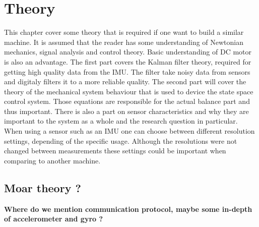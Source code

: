 \documentclass[a4paper,11pt]{kth-mag}
\begin{document}
\chapter{Theory}
This chapter cover some theory that is required if one want to build a similar machine. It is assumed that the reader has some 
understanding of Newtonian mechanics, signal analysis and control theory. Basic understanding of DC motor is also an advantage.  
The first part covers the Kalman filter theory, required for getting high quality data from the IMU. The filter take noisy data from sensors and digitaly filters it to a more reliable quality. The second part will cover 
the theory of the mechanical system behaviour that is used to device the state space control system. Those equations are responsible for the actual balance part and thus important. There is also a part on sensor characteristics and why they are important 
to the system as a whole and the research question in particular. When using a sensor such as an IMU one can choose between different resolution settings, depending of the specific usage. Although the resolutions were not changed between measurements these settings could be important when comparing to another machine.

\section{Moar theory ?}
\textbf{Where do we mention communication protocol, maybe some in-depth of accelerometer and gyro ? }
\end{document}
